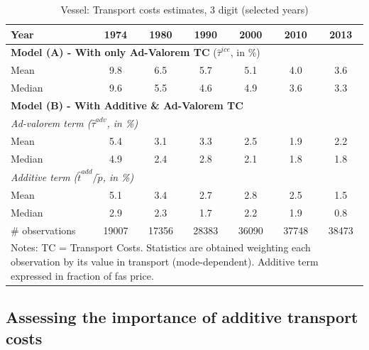 \documentclass[a4paper,11pt]{article}
\begin{document}
\begin{table}[htbp]
  \centering
  \caption{Vessel: Transport costs estimates, 3 digit (selected years)}
\begin{center}
    \begin{tabular}{l|cccccc}
   \hline\hline
Year         & 1974  & 1980  & 1990  & 2000  & 2010  & 2013   \\
 \hline
   \multicolumn{7}{l}{\textbf{Model (A) - With only Ad-Valorem TC} ($\widehat{\tau}^{ice}$, in \%)}  \\
   \hline
Mean  & 9.8 & 6.5 & 5.7 & 5.1 & 4.0 & 3.6  \\
Median & 9.6 & 5.5 & 4.6 & 4.9 & 3.6 & 3.3  \\
\hline
\multicolumn{7}{l}{\textbf{Model (B) - With Additive \& Ad-Valorem TC}}    \\
\hline
\multicolumn{7}{l}{\textit{Ad-valorem term ($\widehat{\tau}^{adv}$, in \%)} } \\
\hline
Mean  & 5.4 & 3.1 & 3.3 & 2.5 & 1.9 & 2.2 \\
Median & 4.9 & 2.4 & 2.8 & 2.1 & 1.8 & 1.8  \\
\hline
\multicolumn{7}{l}{\textit{Additive term ($\widehat{t}^{add}/\widetilde{p}$, in \%)}}  \\
\hline
Mean  & 5.1 & 3.4 & 2.7 & 2.8 & 2.5 & 1.5  \\
Median & 2.9 & 2.3 & 1.7 & 2.2 & 1.9 & 0.8 \\
\hline
 \# observations & 19007 & 17356 & 28383 & 36090 & 37748 & 38473 \\
\hline\hline
\multicolumn{7}{l}{\parbox[l]{11cm}{ \vspace{7pt}\scriptsize{Notes: TC = Transport Costs. Statistics are obtained weighting each observation by its value in transport (mode-dependent). Additive term expressed in fraction of fas price.}}}
\end{tabular}%
\end{center} \label{tab:result_ves_3d_detail}
\end{table}%


\subsection{Assessing the importance of additive transport costs \label{app:diagnostic_test}}
\end{document}
